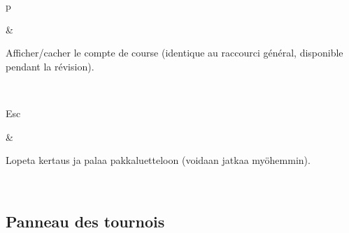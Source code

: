 \documentclass[letterpaper,10pt,finnish]{sphinxmanual}
\begin{document}
\begin{savenotes}
\begin{tabular}[t]{}
\begin{varwidth}[t]{}
p
\sphinxbeforeendvarwidth
\end{varwidth}%
&\begin{varwidth}[t]{}
\sphinxAtStartPar
Afficher/cacher le compte de course (identique au raccourci général, disponible pendant la révision).
\sphinxbeforeendvarwidth
\end{varwidth}%
\\
\sphinxhline\begin{varwidth}[t]{}
\sphinxAtStartPar
Esc
\sphinxbeforeendvarwidth
\end{varwidth}%
&\begin{varwidth}[t]{}
\sphinxAtStartPar
Lopeta kertaus ja palaa pakkaluetteloon (voidaan jatkaa myöhemmin).
\sphinxbeforeendvarwidth
\end{varwidth}%
\\
\sphinxbottomrule
\end{tabular}
\sphinxtableafterendhook\par
\sphinxattableend\end{savenotes}


\subsection{Panneau des tournois}
\label{\detokenize{raccourcis:panneau-des-tournois}}\label{\detokenize{raccourcis:raccourcis-tournament-panel}}
\end{document}
